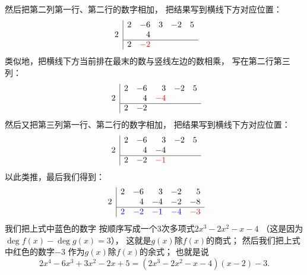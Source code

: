 \begin{example}
\begin{solution}
然后把第二列第一行、第二行的数字相加，
把结果写到横线下方对应位置：\begin{equation*}
	\begin{array}{r|*5r}
		& 2 & -6 & 3 & -2 & 5 \\
		2 && 4 \\ \cline{2-6}
		& 2 & {\color{red}-2}
	\end{array}
\end{equation*}
类似地，把横线下方当前排在最末的数与竖线左边的数相乘，
写在第二行第三列：\begin{equation*}
	\begin{array}{r|*5r}
		& 2 & -6 & 3 & -2 & 5 \\
		2 && 4 & {\color{red}-4} \\ \cline{2-6}
		& 2 & -2
	\end{array}
\end{equation*}
然后又把第三列第一行、第二行的数字相加，
把结果写到横线下方对应位置：\begin{equation*}
	\begin{array}{r|*5r}
		& 2 & -6 & 3 & -2 & 5 \\
		2 && 4 & -4 \\ \cline{2-6}
		& 2 & -2 & {\color{red}-1}
	\end{array}
\end{equation*}
以此类推，最后我们得到：\begin{equation*}
	\begin{array}{r|*5r}
		& 2 & -6 & 3 & -2 & 5 \\
		2 && 4 & -4 & -2 & -8 \\ \cline{2-6}
		& \color{blue}2 & \color{blue}-2 & \color{blue}-1 & \color{blue}-4
		& {\color{red}-3}
	\end{array}
\end{equation*}
我们把上式中蓝色的数字
按顺序写成一个3次多项式\(2x^3-2x^2-x-4\)
（这是因为\(\deg f(x)-\deg g(x)=3\)），
这就是\(g(x)\)除\(f(x)\)的商式；
然后我们把上式中红色的数字\(-3\)
作为\(g(x)\)除\(f(x)\)的余式；
也就是说\begin{equation*}
	2x^4-6x^3+3x^2-2x+5
	=(2x^3-2x^2-x-4)(x-2)-3.
\end{equation*}
\end{solution}
\end{example}

